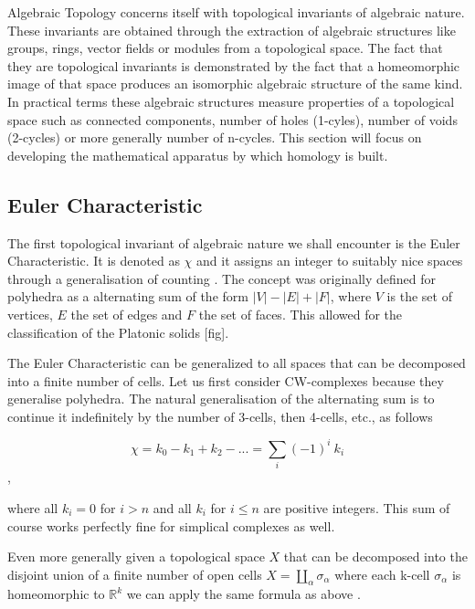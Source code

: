Algebraic Topology concerns itself with topological invariants of algebraic nature. These invariants are obtained through the extraction of algebraic structures like groups, rings, vector fields or modules from a topological space. The fact that they are topological invariants is demonstrated by the fact that a homeomorphic image of that space produces an isomorphic algebraic structure of the same kind. In practical terms these algebraic structures measure properties of a topological space such as connected components, number of holes (1-cyles), number of voids (2-cycles) or more generally number of n-cycles. This section will focus on developing the mathematical apparatus by which homology is built.

\subsection{Euler Characteristic}

The first topological invariant of algebraic nature we shall encounter is the Euler Characteristic. It is denoted as $\chi$ and it assigns an integer to suitably nice spaces through a generalisation of counting \cite{elementary-applied-topology}. The concept was originally defined for polyhedra as a alternating sum of the form $|V| - |E| + |F|$, where $V$ is the set of vertices, $E$ the set of edges and $F$ the set of faces. This allowed for the classification of the Platonic solids [fig].


The Euler Characteristic can be generalized to all spaces that can be decomposed into a finite number of cells. Let us first consider CW-complexes because they generalise polyhedra. The natural generalisation of the alternating sum is to continue it indefinitely by the number of 3-cells, then 4-cells, etc., as follows

$$ \chi = k_0 - k_1 + k_2 - ... = \sum_{i}{(-1)^i~k_i}  $$,

where all $k_i = 0$ for $i > n$ and all $k_i$ for $i \le n$ are positive integers. This sum of course works perfectly fine for simplical complexes as well.


Even more generally given a topological space $X$ that can be decomposed into the disjoint union of a finite number of open cells $X = \coprod_{\alpha}\sigma_{\alpha}$ where each k-cell $\sigma_{\alpha}$ is homeomorphic to $\mathbb{R}^k$ we can apply the same formula as above \cite{elementary-applied-topology}. 

